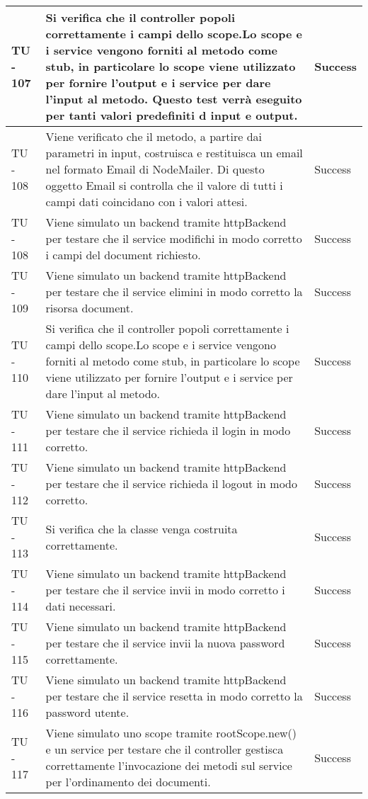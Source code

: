 \begin{center}
\begin{longtable}{ | p{3cm} | p{9cm} | p{2cm} | }
TU - 107 & Si verifica che il controller popoli correttamente i campi dello scope.Lo scope e i service vengono forniti al metodo come stub, in particolare lo scope viene utilizzato per fornire l'output e i service per dare l'input al metodo. Questo test verrà eseguito per tanti valori predefiniti d input e output. & Success \\ \hline
TU - 108 & Viene verificato che il metodo, a partire dai parametri in input, costruisca e restituisca un email nel formato Email di NodeMailer. Di questo oggetto Email si controlla che il valore di tutti i campi dati coincidano con i valori attesi. & Success \\ \hline
TU - 108 & Viene simulato un backend tramite httpBackend per testare che il service modifichi in modo corretto i campi del document richiesto. & Success \\ \hline
TU - 109 & Viene simulato un backend tramite httpBackend per testare che il service elimini in modo corretto la risorsa document. & Success \\ \hline
TU - 110 & Si verifica che il controller popoli correttamente i campi dello scope.Lo scope e i service vengono forniti al metodo come stub, in particolare lo scope viene utilizzato per fornire l'output e i service per dare l'input al metodo. & Success \\ \hline
TU - 111 & Viene simulato un backend tramite httpBackend per testare che il service richieda il login in modo corretto. & Success \\ \hline
TU - 112 & Viene simulato un backend tramite httpBackend per testare che il service richieda il logout in modo corretto. & Success \\ \hline
TU - 113 & Si verifica che la classe venga costruita correttamente. & Success \\ \hline
TU - 114 & Viene simulato un backend tramite httpBackend per testare che il service invii in modo corretto i dati necessari. & Success \\ \hline
TU - 115 & Viene simulato un backend tramite httpBackend per testare che il service invii la nuova password correttamente.  & Success \\ \hline
TU - 116 & Viene simulato un backend tramite httpBackend per testare che il service resetta in modo corretto la password utente. & Success \\ \hline
TU - 117 & Viene simulato uno scope tramite rootScope.new() e un service per testare che il controller gestisca correttamente l'invocazione dei metodi sul service per l'ordinamento dei documenti. & Success \\ \hline

\end{longtable}
\end{center}

